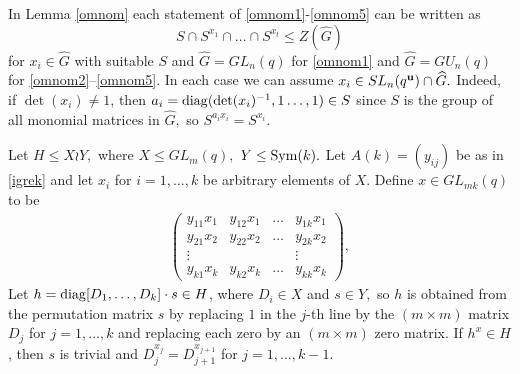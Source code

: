\begin{Rem} \label{omnomSL}
In Lemma \ref{omnom} each statement of \eqref{omnom1}-\eqref{omnom5} can be written as $$S \cap S^{x_1} \cap \ldots \cap S^{x_t}\le Z(\widehat{G})$$ for $x_i \in \widehat{G}$ with suitable $S$ and $\widehat{G}=GL_n(q)$ for \eqref{omnom1} and $\widehat{G}=GU_n(q)$ for \eqref{omnom2}--\eqref{omnom5}. In each case we can assume $x_i \in SL_n(q^{\bf u}) \cap \widehat{G}.$ Indeed, if $\det(x_i)\ne 1$, then $a_i=\mathrm{diag}(\det(x_i)^{-1},1\ldots, 1) \in S$ since $S$ is the group of all monomial matrices in $\hat{G},$ so $S^{a_ix_i}=S^{x_i}.$
\end{Rem}

\begin{Lem}\label{igrekl}
Let $H \le X \wr Y,$ where $X \le GL_m(q),$ $Y \le \mathrm{Sym}(k).$  
Let $A(k)=(y_{ij})$ be as in \eqref{igrek} and let $x_i$ for $i =1, \ldots, k$ be arbitrary elements of $X$.
Define $x \in GL_{mk}(q)$ to be
\begin{gather*}
\begin{pmatrix}
y_{11}x_1      & y_{12}x_1      & \ldots     & y_{1k}x_1            \\
y_{21}x_2      &  y_{22}x_2     & \ldots     & y_{2k}x_2             \\
\vdots      &             &            & \vdots               \\
y_{k 1}x_{k}   & y_{k 2}x_{k}   &  \ldots    & y_{k k}x_{k}               
\end{pmatrix},
\end{gather*} 
 Let $h=\mathrm{diag}[D_1, \ldots, D_k] \cdot s  \in H$, where $D_i \in X$ and $s \in Y,$ so $h$ is obtained from the permutation matrix $s$ by replacing $1$ in the $j$-th line by the $(m \times m)$ matrix $D_j$ for $j =1, \ldots, k$ and replacing each zero by an $(m\times m)$ zero matrix. 
If $h^x \in H$, then $s$ is trivial and $D_j^{x_j}=D_{j+1}^{x_{j+1}}$ for $j=1, \ldots, k-1.$ 
\end{Lem}
